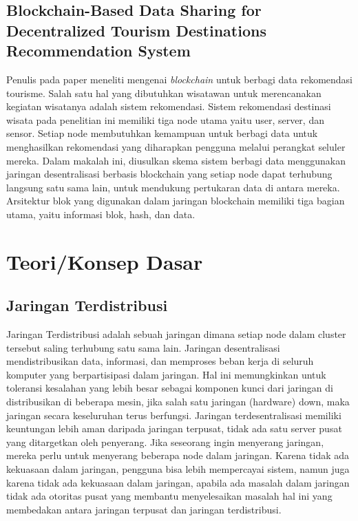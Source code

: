 \subsection{Blockchain-Based Data Sharing for Decentralized Tourism Destinations Recommendation System}
Penulis pada paper \parencite{hariadi2020} meneliti mengenai \emph{blockchain} untuk berbagi data rekomendasi tourisme.
Salah satu hal yang dibutuhkan wisatawan untuk merencanakan kegiatan wisatanya adalah sistem rekomendasi. 
Sistem rekomendasi destinasi wisata pada penelitian ini memiliki tiga node utama yaitu user, server, dan sensor. 
Setiap node membutuhkan kemampuan untuk berbagi data untuk menghasilkan rekomendasi yang diharapkan pengguna melalui perangkat seluler mereka. 
Dalam makalah ini, diusulkan skema sistem berbagi data menggunakan jaringan desentralisasi berbasis blockchain yang setiap node dapat terhubung langsung satu sama lain, untuk mendukung pertukaran data di antara mereka. Arsitektur blok yang digunakan dalam jaringan blockchain memiliki tiga bagian utama, yaitu informasi blok, hash, dan data.

\section{Teori/Konsep Dasar}

\subsection{Jaringan Terdistribusi}

Jaringan Terdistribusi adalah sebuah jaringan dimana setiap
node dalam cluster tersebut saling terhubung satu sama lain. 
Jaringan desentralisasi mendistribusikan data, informasi, dan 
memproses beban kerja di seluruh komputer yang berpartisipasi dalam
jaringan. Hal ini memungkinkan untuk toleransi kesalahan yang
lebih besar sebagai komponen kunci dari jaringan di distribusikan
di beberapa mesin, jika salah satu jaringan (hardware) down, maka
jaringan secara keseluruhan terus berfungsi.
Jaringan terdesentralisasi memiliki keuntungan lebih aman 
daripada jaringan terpusat, tidak ada satu server pusat yang 
ditargetkan oleh penyerang. Jika seseorang ingin menyerang jaringan, mereka
perlu untuk menyerang beberapa node dalam jaringan. Karena 
tidak ada kekuasaan dalam jaringan, pengguna bisa lebih 
mempercayai sistem, namun juga karena tidak ada kekuasaan dalam jaringan,
apabila ada masalah dalam jaringan tidak ada otoritas pusat yang
membantu menyelesaikan masalah hal ini yang membedakan 
antara jaringan terpusat dan jaringan terdistribusi.

